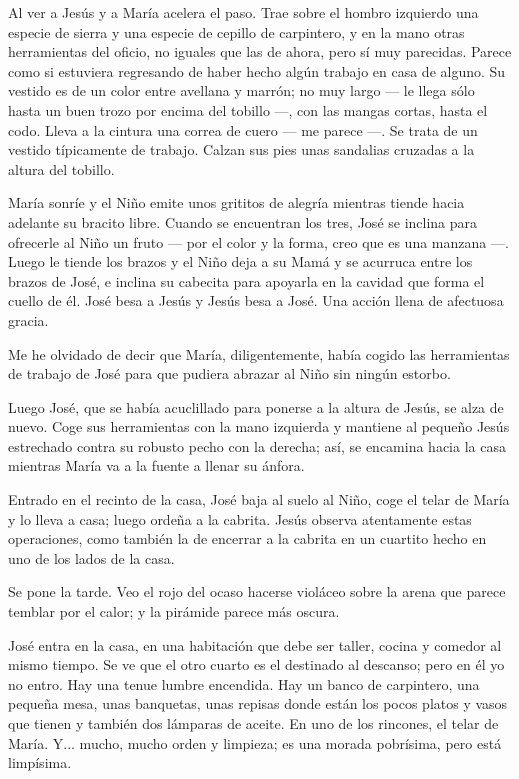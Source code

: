 \documentclass[12pt, twoside, openright]{book} %
\begin{document}
Al ver a Jesús y a María acelera el paso. Trae sobre el hombro izquierdo una especie de sierra y una especie de cepillo de carpintero, y en la mano otras herramientas del oficio, no iguales que las de ahora, pero sí muy parecidas. Parece como si estuviera regresando de haber hecho algún trabajo en casa de alguno. Su vestido es de un color entre avellana y marrón; no muy largo — le llega sólo hasta un buen trozo por encima del tobillo —, con las mangas cortas, hasta el codo. Lleva a la cintura una correa de cuero — me parece —. Se trata de un vestido típicamente de trabajo. Calzan sus pies unas sandalias cruzadas a la altura del tobillo. 

María sonríe y el Niño emite unos grititos de alegría mientras tiende hacia adelante su bracito libre. Cuando se encuentran los tres, José se inclina para ofrecerle al Niño un fruto — por el color y la forma, creo que es una manzana —. Luego le tiende los brazos y el Niño deja a su Mamá y se acurruca entre los brazos de José, e inclina su cabecita para apoyarla en la cavidad que forma el cuello de él. José besa a Jesús y Jesús besa a José. Una acción llena de afectuosa gracia. 

Me he olvidado de decir que María, diligentemente, había cogido las herramientas de trabajo de José para que pudiera abrazar al Niño sin ningún estorbo. 

Luego José, que se había acuclillado para ponerse a la altura de Jesús, se alza de nuevo. Coge sus herramientas con la mano izquierda y mantiene al pequeño Jesús estrechado contra su robusto pecho con la derecha; así, se encamina hacia la casa mientras María va a la fuente a llenar su ánfora. 

Entrado en el recinto de la casa, José baja al suelo al Niño, coge el telar de María y lo lleva a casa; luego ordeña a la cabrita. Jesús observa atentamente estas operaciones, como también la de encerrar a la cabrita en un cuartito hecho en uno de los lados de la casa. 

Se pone la tarde. Veo el rojo del ocaso hacerse violáceo sobre la arena que parece temblar por el calor; y la pirámide parece más oscura. 

José entra en la casa, en una habitación que debe ser taller, cocina y comedor al mismo tiempo. Se ve que el otro cuarto es el destinado al descanso; pero en él yo no entro. Hay una tenue lumbre encendida. Hay un banco de carpintero, una pequeña mesa, unas banquetas, unas repisas donde están los pocos platos y vasos que tienen y también dos lámparas de aceite. En uno de los rincones, el telar de María. Y... mucho, mucho orden y limpieza; es una morada pobrísima, pero está limpísima. 
\end{document}
